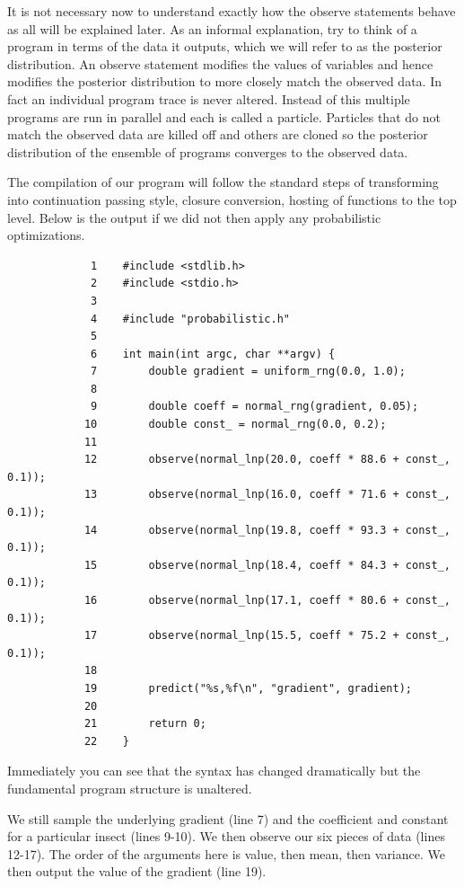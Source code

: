 \documentclass[a4paper]{article}
\begin{document}
It is not necessary now to understand exactly how the observe statements behave as all will be explained later. As an informal explanation, try to think of a program in terms of the data it outputs, which we will refer to as the posterior distribution. An observe statement modifies the values of variables and hence modifies the posterior distribution to more closely match the observed data. In fact an individual program trace is never altered. Instead of this multiple programs are run in parallel and each is called a particle. Particles that do not match the observed data are killed off and others are cloned so the posterior distribution of the ensemble of programs converges to the observed data.

The compilation of our program will follow the standard steps of transforming into continuation passing style, closure conversion, hosting of functions to the top level. Below is the output if we did not then apply any probabilistic optimizations.

\begin{center}
	\begin{varwidth}{\linewidth}
		\small
		\begin{verbatim}
			 1    #include <stdlib.h>
			 2    #include <stdio.h>
			 3
			 4    #include "probabilistic.h"
			 5
			 6    int main(int argc, char **argv) {
			 7        double gradient = uniform_rng(0.0, 1.0);
			 8
			 9        double coeff = normal_rng(gradient, 0.05);
			10        double const_ = normal_rng(0.0, 0.2);
			11
			12        observe(normal_lnp(20.0, coeff * 88.6 + const_, 0.1));
			13        observe(normal_lnp(16.0, coeff * 71.6 + const_, 0.1));
			14        observe(normal_lnp(19.8, coeff * 93.3 + const_, 0.1));
			15        observe(normal_lnp(18.4, coeff * 84.3 + const_, 0.1));
			16        observe(normal_lnp(17.1, coeff * 80.6 + const_, 0.1));
			17        observe(normal_lnp(15.5, coeff * 75.2 + const_, 0.1));
			18
			19        predict("%s,%f\n", "gradient", gradient);
			20
			21        return 0;
			22    }
		\end{verbatim}
	\end{varwidth}
\end{center}
Immediately you can see that the syntax has changed dramatically but the fundamental program structure is unaltered.

We still sample the underlying gradient (line 7) and the coefficient and constant for a particular insect (lines 9-10). We then observe our six pieces of data (lines 12-17). The order of the arguments here is value, then mean, then variance. We then output the value of the gradient (line 19).
\end{document}

